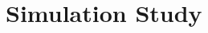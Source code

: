 \documentclass[12pt, a4paper, titilepage]{article}
\begin{document}

\section*{Simulation Study}
\end{document}
